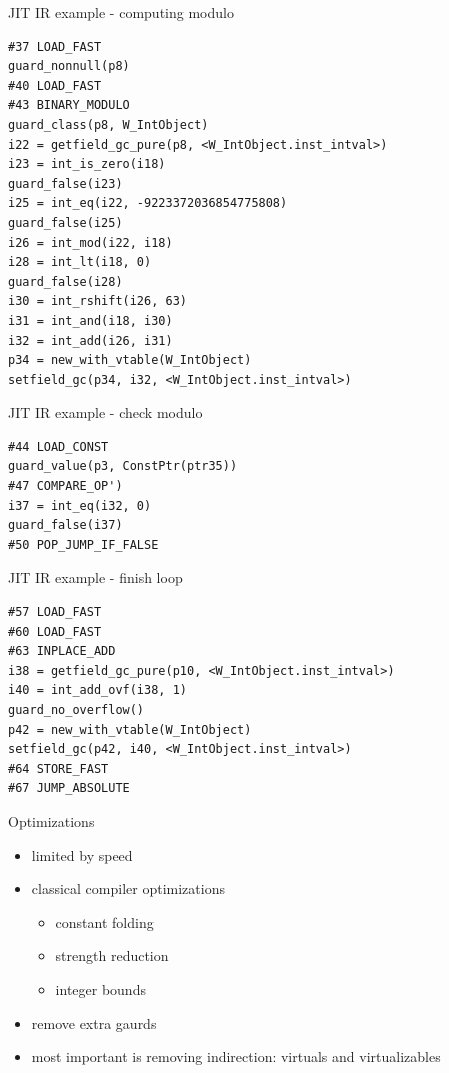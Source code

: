 \documentclass[14pt]{beamer}
\begin{document}
\begin{frame}[fragile]{JIT IR example - computing modulo}
\footnotesize{
\begin{verbatim}
#37 LOAD_FAST
guard_nonnull(p8)
#40 LOAD_FAST
#43 BINARY_MODULO
guard_class(p8, W_IntObject)
i22 = getfield_gc_pure(p8, <W_IntObject.inst_intval>)
i23 = int_is_zero(i18)
guard_false(i23)
i25 = int_eq(i22, -9223372036854775808)
guard_false(i25)
i26 = int_mod(i22, i18)
i28 = int_lt(i18, 0)
guard_false(i28)
i30 = int_rshift(i26, 63)
i31 = int_and(i18, i30)
i32 = int_add(i26, i31)
p34 = new_with_vtable(W_IntObject)
setfield_gc(p34, i32, <W_IntObject.inst_intval>)
\end{verbatim}
}
\end{frame}

\begin{frame}[fragile]{JIT IR example - check modulo}
\footnotesize{
\begin{verbatim}
#44 LOAD_CONST
guard_value(p3, ConstPtr(ptr35))
#47 COMPARE_OP')
i37 = int_eq(i32, 0)
guard_false(i37)
#50 POP_JUMP_IF_FALSE
\end{verbatim}
}
\end{frame}

\begin{frame}[fragile]{JIT IR example - finish loop}
\footnotesize{
\begin{verbatim}
#57 LOAD_FAST
#60 LOAD_FAST
#63 INPLACE_ADD
i38 = getfield_gc_pure(p10, <W_IntObject.inst_intval>)
i40 = int_add_ovf(i38, 1)
guard_no_overflow()
p42 = new_with_vtable(W_IntObject)
setfield_gc(p42, i40, <W_IntObject.inst_intval>)
#64 STORE_FAST
#67 JUMP_ABSOLUTE
\end{verbatim}
}
\end{frame}

\begin{frame}{Optimizations}
\begin{itemize}
\item limited by speed
\item classical compiler optimizations
\begin{itemize}
\item constant folding
\item strength reduction
\item integer bounds
\end{itemize}
\item remove extra gaurds
\item most important is removing indirection: virtuals and virtualizables
\end{itemize}
\end{frame}
\end{document}
